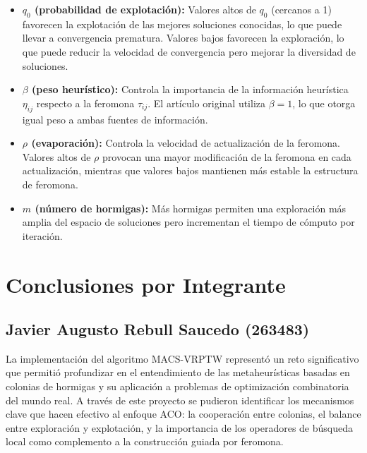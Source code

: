 \documentclass[12pt, letterpaper]{article}
\begin{document}
\begin{itemize}[leftmargin=2cm]
  \item \textbf{$q_0$ (probabilidad de explotación):} Valores altos de $q_0$ (cercanos a 1) favorecen la explotación de las mejores soluciones conocidas, lo que puede llevar a convergencia prematura. Valores bajos favorecen la exploración, lo que puede reducir la velocidad de convergencia pero mejorar la diversidad de soluciones.
  \item \textbf{$\beta$ (peso heurístico):} Controla la importancia de la información heurística $\eta_{ij}$ respecto a la feromona $\tau_{ij}$. El artículo original utiliza $\beta = 1$, lo que otorga igual peso a ambas fuentes de información.
  \item \textbf{$\rho$ (evaporación):} Controla la velocidad de actualización de la feromona. Valores altos de $\rho$ provocan una mayor modificación de la feromona en cada actualización, mientras que valores bajos mantienen más estable la estructura de feromona.
  \item \textbf{$m$ (número de hormigas):} Más hormigas permiten una exploración más amplia del espacio de soluciones pero incrementan el tiempo de cómputo por iteración.
\end{itemize}

\section{Conclusiones por Integrante}
\label{sec:conclusiones}

\subsection{Javier Augusto Rebull Saucedo (263483)}
\label{subsec:conclusion_javier}


La implementación del algoritmo MACS-VRPTW representó un reto significativo que permitió profundizar en el entendimiento de las metaheurísticas basadas en colonias de hormigas y su aplicación a problemas de optimización combinatoria del mundo real. A través de este proyecto se pudieron identificar los mecanismos clave que hacen efectivo al enfoque ACO: la cooperación entre colonias, el balance entre exploración y explotación, y la importancia de los operadores de búsqueda local como complemento a la construcción guiada por feromona.
\end{document}
